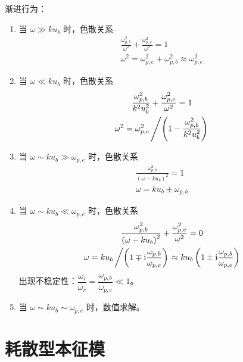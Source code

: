 渐进行为：
\begin{enumerate}
    \item 当 $\omega \gg k u_b$ 时，色散关系
\begin{equation}\begin{gathered}
\frac{\omega_{p,b}^2}{\omega^2} + \frac{\omega_{p,e}^2}{\omega^2} = 1 \\
\omega^2 = \omega_{p,e}^2 + \omega_{p,b}^2 \approx \omega_{p,e}^2
\end{gathered}\end{equation}
    \item 当 $\omega \ll k u_b$ 时，色散关系
\begin{equation}\begin{gathered}
\frac{\omega_{p,b}^2}{k^2 u_b^2} + \frac{\omega_{p,e}^2}{\omega^2} = 1 \\
\omega^2 = \omega_{p,e}^2 \left/\left(1 - \frac{\omega_{p,b}^2}{k^2 u_b^2} \right)\right.
\end{gathered}\end{equation}
    \item 当 $\omega \sim k u_b \gg \omega_{p,e}$ 时，色散关系
\begin{equation}\begin{gathered}
\frac{\omega_{p,b}^2}{\left(\omega - k u_b\right)^2} = 1 \\
\omega = k u_b \pm \omega_{p,b}
\end{gathered}\end{equation}
    \item 当 $\omega \sim k u_b \ll \omega_{p,e}$ 时，色散关系
\begin{equation}\begin{gathered}
\frac{\omega_{p,b}^2}{\left(\omega - k u_b\right)^2} + \frac{\omega_{p,e}^2}{\omega^2} = 0 \\
\omega = k u_b \left/\left(1 \mp \mathrm{i} \frac{\omega_{p,b}}{\omega_{p,e}} \right)\right.
\approx k u_b \left(1 \pm \mathrm{i} \frac{\omega_{p,b}}{\omega_{p,e}} \right)
\end{gathered}\end{equation}
出现不稳定性：$\dfrac{\omega_i}{\omega_r} = \dfrac{\omega_{p,b}}{\omega_{p,e}} \ll 1$。
    \item 当 $\omega \sim k u_b \sim \omega_{p,e}$ 时，数值求解。
\end{enumerate}

\section{耗散型本征模}

